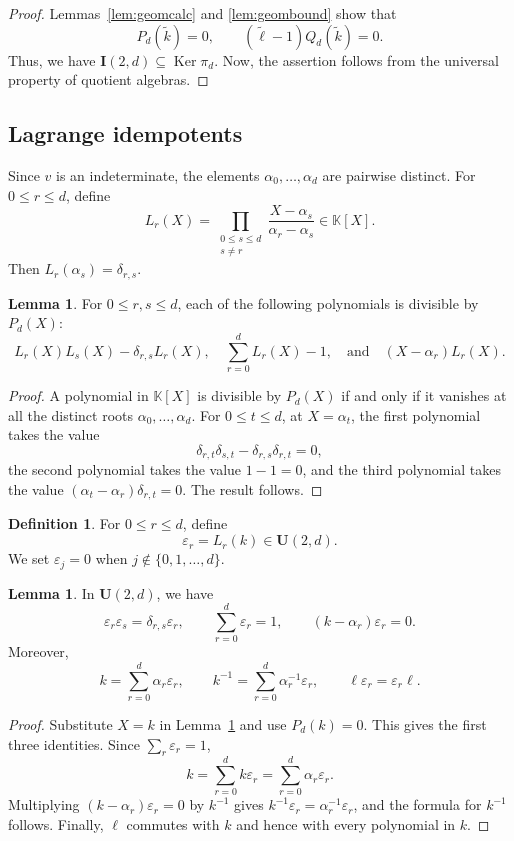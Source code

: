 \documentclass[12pt]{amsart}
\numberwithin{equation}{section}
\theoremstyle{definition}
\newtheorem{lemma}[theorem]{Lemma}
\theoremstyle{definition}
\newtheorem{definition}[theorem]{Definition}
\newcommand{\kk}{\mathbb K}
\newcommand{\Ufd}{\mathbf U(2,d)}
\newcommand{\eps}{\varepsilon}
\newcommand{\tk}{\widetilde k}
\newcommand{\tell}{\widetilde\ell}
\newcommand{\Ker}{\operatorname{Ker}}
\newcommand{\Ifd}{\mathbf{I}(2,d)}
\begin{document}
\begin{proof}
Lemmas~\ref{lem:geomcalc} and \ref{lem:geombound} show that
$$
P_d(\tk)=0,
\qquad
(\tell-1)Q_d(\tk)=0.
$$
Thus, we have $\Ifd\subseteq\Ker\pi_d$. 
Now, the assertion follows from the universal property of quotient algebras.
\end{proof}


\subsection{Lagrange idempotents}\label{subsec:lagrange}

Since $v$ is an indeterminate, the elements $\alpha_0,\ldots,\alpha_d$ are pairwise distinct. 
For $0\le r\le d$, define
$$
L_r(X)=
\prod_{\substack{0\le s\le d\\s\ne r}}
\frac{X-\alpha_s}{\alpha_r-\alpha_s}
\in\kk[X].
$$
Then $L_r(\alpha_s)=\delta_{r,s}$.


\begin{lemma}\label{lem:poly}
For $0\le r,s\le d$, each of the following polynomials is divisible by $P_d(X)$:
$$
L_r(X)L_s(X)-\delta_{r,s}L_r(X),\quad \sum_{r=0}^{d}L_r(X)-1,\quad\text{and}\quad (X-\alpha_r)L_r(X).
$$
\end{lemma}
\begin{proof}
A polynomial in $\kk[X]$ is divisible by $P_d(X)$ if and only if it vanishes at all the distinct roots $\alpha_0,\ldots,\alpha_d$. 
For $0\le t\le d$, at $X=\alpha_t$, the first polynomial takes the value
$$
\delta_{r,t}\delta_{s,t}-\delta_{r,s}\delta_{r,t}=0,
$$
the second polynomial takes the value $1-1=0$, and the third polynomial takes the value $(\alpha_t-\alpha_r)\delta_{r,t}=0$.
The result follows.
\end{proof}

\begin{definition}\label{def:eps}
For $0\le r\le d$, define
$$
\eps_r=L_r(k)\in\Ufd.
$$
We set $\eps_j=0$ when $j\notin\{0,1,\ldots,d\}$.
\end{definition}

\begin{lemma}\label{lem:eps}
In $\Ufd$, we have
$$
\eps_r\eps_s=\delta_{r,s}\eps_r,
\qquad
\sum_{r=0}^{d}\eps_r=1,
\qquad
(k-\alpha_r)\eps_r=0.
$$
Moreover,
$$
k=\sum_{r=0}^{d}\alpha_r\eps_r,
\qquad
k^{-1}=\sum_{r=0}^{d}\alpha_r^{-1}\eps_r,
\qquad
\ell\eps_r=\eps_r\ell.
$$
\end{lemma}
\begin{proof}
Substitute $X=k$ in Lemma~\ref{lem:poly} and use $P_d(k)=0$. This gives the first three identities. Since $\sum_r\eps_r=1$,
$$
k=\sum_{r=0}^{d}k\eps_r
=\sum_{r=0}^{d}\alpha_r\eps_r.
$$
Multiplying $(k-\alpha_r)\eps_r=0$ by $k^{-1}$ gives $k^{-1}\eps_r=\alpha_r^{-1}\eps_r$, and the formula for $k^{-1}$ follows. Finally, $\ell$ commutes with $k$ and hence with every polynomial in $k$.
\end{proof}
\end{document}
